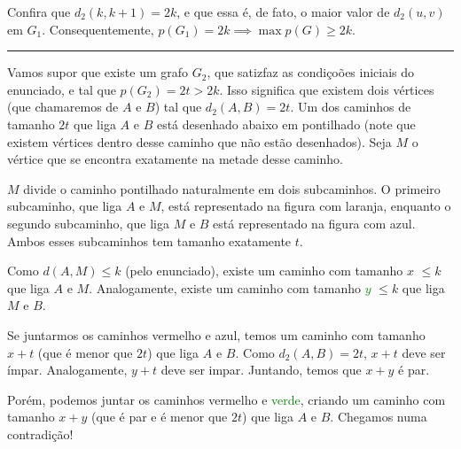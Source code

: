 \documentclass[10pt, a4paper]{article}
\newcommand{\sep}{
	
	\begin{center}
		\vspace{-.6em}
		\rule{10cm}{.5pt}
		\vspace{-.3em}
	\end{center}

}
\begin{document}
Confira que $d_2(k, k+1) = 2k$, e que essa é, de fato, o maior valor de $d_2(u, v)$ em $G_1$. Consequentemente, $p(G_1) = 2k \implies \max p(G) \ge 2k$.

\sep

Vamos supor que existe um grafo $G_2$, que satizfaz as condiçoões iniciais do enunciado, e tal que $p(G_2) = 2t > 2k$. Isso significa que existem dois vértices (que chamaremos de $A$ e $B$) tal que $d_2(A, B) = 2t$. Um dos caminhos de tamanho $2t$ que liga $A$ e $B$ está desenhado abaixo em pontilhado (note que existem vértices dentro desse caminho que não estão desenhados). Seja $M$ o vértice que se encontra exatamente na metade desse caminho.

$M$ divide o caminho pontilhado naturalmente em dois subcaminhos. O primeiro subcaminho, que liga $A$ e $M$, está representado na figura com \textcolor{ffxfqq}{laranja}, enquanto o segundo subcaminho, que liga $M$ e $B$ está representado na figura com \textcolor{qqzcbt}{azul}. Ambos esses subcaminhos tem tamanho exatamente $t$.

Como $d(A, M) \le k$ (pelo enunciado), existe um caminho com tamanho \textcolor{dcrutc}{$x$} $\le k$ que liga $A$ e $M$. Analogamente, existe um caminho com tamanho \textcolor{green}{$y$} $\le k$ que liga $M$ e $B$.

Se juntarmos os caminhos \textcolor{dcrutc}{vermelho} e \textcolor{qqzcbt}{azul}, temos um caminho com tamanho $x + t$ (que é menor que $2t$) que liga $A$ e $B$. Como $d_2(A, B) = 2t$, $x + t$ deve ser ímpar. Analogamente, $y + t$ deve ser impar. Juntando, temos que $x + y$ é par.

Porém, podemos juntar os caminhos \textcolor{dcrutc}{vermelho} e \textcolor{green}{verde}, criando um caminho com tamanho $x + y$ (que é par e é menor que $2t$) que liga $A$ e $B$. Chegamos numa contradição!
\end{document}
